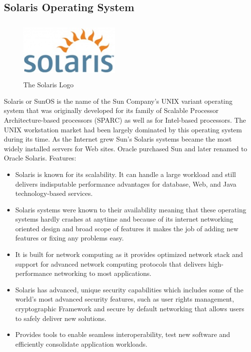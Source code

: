 \documentclass[11pt,a4paper,twoside]{article}
\begin{document}
\subsection{Solaris Operating System}
\begin{figure}
\includegraphics[width=5cm,height=3cm]{Fig 6.jpg}
\caption{The Solaris Logo}
\end{figure}
Solaris or SunOS is the name of the Sun Company’s UNIX variant operating system that was originally developed for its family of Scalable Processor Architecture-based processors (SPARC) as well as for Intel-based processors. The UNIX workstation market had been largely dominated by this operating system during its time. As the Internet grew Sun’s Solaris systems became the most widely installed servers for Web sites. Oracle purchased Sun and later renamed to Oracle Solaris.
\newline
Features:
\begin{itemize}
\item Solaris is known for its scalability. It can handle a large workload and still delivers indisputable performance advantages for database, Web, and Java technology-based services.
\item Solaris systems were known to their availability meaning that these operating systems hardly crashes at anytime and because of its internet networking oriented design and broad scope of features it makes the job of adding new features or fixing any problems easy.
\item It is built for network computing as it provides optimized network stack and support for advanced network computing protocols that delivers high-performance networking to most applications.
\item Solaris has advanced, unique security capabilities which includes some of the world’s most advanced security features, such as user rights management, cryptographic Framework and secure by default networking that allows users to safely deliver new solutions.
\item Provides tools to enable seamless interoperability, test new software and efficiently consolidate application workloads.
\end{itemize}
\end{document}

